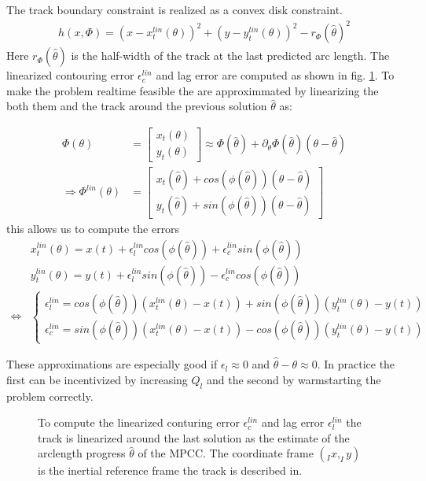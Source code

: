 \documentclass[12pt]{article}
\begin{document}
The track boundary constraint is realized as a convex disk constraint.
\begin{align}
h(x,\Phi) = (x-x_t^{lin}(\theta))^2 + (y-y_t^{lin}(\theta))^2 - r_{\Phi}(\hat{\theta})^2
\end{align}
Here $r_{\Phi}(\hat{\theta})$ is the half-width of the track at the last predicted arc length.
\newpage
The linearized contouring error $\epsilon_c^{lin}$ and lag error are computed as shown in fig. \ref{fig:contouring}. To make the problem realtime feasible the are approximmated by linearizing the both them and the track around the previous solution $\hat\theta$ as:

\begin{align}
\Phi(\theta) &= \begin{bmatrix}
x_t(\theta)\\y_t(\theta)
\end{bmatrix}\approx\Phi(\hat\theta) + \partial_{\theta} \Phi(\hat\theta)(\theta-\hat\theta) \\
\Rightarrow \Phi^{lin}(\theta) &= \begin{bmatrix}
x_t(\hat\theta)+cos(\phi(\hat\theta))(\theta-\hat\theta)\\
y_t(\hat\theta)+sin(\phi(\hat\theta))(\theta-\hat\theta)
\end{bmatrix} 
\end{align}
this allows us to compute the errors
\begin{align}
&x_t^{lin}(\theta) = x(t) + \epsilon^{lin}_lcos(\phi(\hat\theta))+ \epsilon^{lin}_csin(\phi(\hat\theta))\\
&y_t^{lin}(\theta) = y(t) + \epsilon^{lin}_lsin(\phi(\hat\theta))- \epsilon^{lin}_ccos(\phi(\hat\theta))\\
\Leftrightarrow &\begin{cases}
\epsilon^{lin}_l = cos(\phi(\hat\theta))(x_t^{lin}(\theta)-x(t))+sin(\phi(\hat\theta))(y_t^{lin}(\theta)-y(t))\\
\epsilon^{lin}_c = sin(\phi(\hat\theta))(x_t^{lin}(\theta)-x(t)) - cos(\phi(\hat\theta))(y_t^{lin}(\theta)-y(t))
\end{cases}
\end{align}

These approximations are especially good if $\epsilon_l\approx0$ and $\hat\theta-\theta \approx 0$. In practice the first can be incentivized by increasing $Q_l$ and the second by warmstarting the problem correctly. 



\begin{figure}[!h]
\centering

\caption{To compute the linearized conturing error $\epsilon_c^{lin}$ and lag error $\epsilon_l^{lin}$ the track is linearized around the last solution as the estimate of the arclength progress $\hat\theta$ of the MPCC. The coordinate frame $(_Ix,_Iy)$ is the inertial reference frame the track is described in.}

\label{fig:contouring}
\end{figure}
\end{document}

